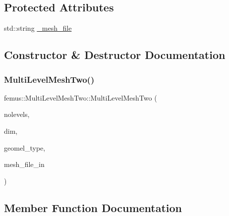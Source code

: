 \subsection*{Protected Attributes}
\begin{DoxyCompactItemize}
\item 
std\+::string \mbox{\hyperlink{classfemus_1_1_multi_level_mesh_two_a2e69e092b1871b1d3023e22ad7748d30}{\+\_\+mesh\+\_\+file}}
\end{DoxyCompactItemize}


\subsection{Constructor \& Destructor Documentation}
\mbox{\label{classfemus_1_1_multi_level_mesh_two_aa6f3b2f33e877654cbe2deec4bcc783b}} 
\subsubsection{\texorpdfstring{Multi\+Level\+Mesh\+Two()}{MultiLevelMeshTwo()}}
{\footnotesize\ttfamily femus\+::\+Multi\+Level\+Mesh\+Two\+::\+Multi\+Level\+Mesh\+Two (\begin{DoxyParamCaption}\item[{const unsigned}]{nolevels,  }\item[{const unsigned}]{dim,  }\item[{const \mbox{\hyperlink{_geom_el_type_enum_8hpp_a5f4d1ffd8f6d0e4930c05074e733031d}{Geom\+El\+Type}}}]{geomel\+\_\+type,  }\item[{const std\+::string}]{mesh\+\_\+file\+\_\+in }\end{DoxyParamCaption})}



\subsection{Member Function Documentation}
\mbox{\label{classfemus_1_1_multi_level_mesh_two_a0957e12f70519d5a208c4dcb64ab1479}} 
